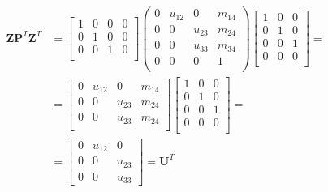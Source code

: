 \documentclass[\main/main.tex]{subfiles}
\begin{document}
\begin{equation}
\begin{split}
    \mathbf{Z} \mathbf{P}^T \mathbf{Z}^T &=
    \begin{bmatrix}
   1 & 0 & 0 & 0\\
    0 & 1 & 0 & 0\\
     0 & 0 & 1 & 0\\
    \end{bmatrix}
    \begin{pmatrix}
    0 &  u_{12} & 0 & m_{14}\\
    0 & 0 & u_{23} & m_{24}\\
    0 & 0 & u_{33} & m_{34}\\
    0 & 0 & 0 &1\\
    \end{pmatrix}
    \begin{bmatrix}
    1 & 0 & 0\\
    0 & 1& 0\\
    0 & 0 & 1\\
    0 & 0 & 0\\
    \end{bmatrix}
    = \\
    &= \begin{bmatrix}
    0 & u_{12} & 0 & m_{14}\\
    0 & 0 & u_{23} & m_{24}\\
    0 & 0 & u_{23} & m_{24}\\
    \end{bmatrix}
    \begin{bmatrix}
    1 & 0 & 0\\
    0 & 1& 0\\
    0 & 0 & 1\\
    0 & 0 & 0\\
    \end{bmatrix} = \\
    &= 
    \begin{bmatrix}
    0 & u_{12} & 0\\
    0 & 0 & u_{23}\\
    0 & 0 & u_{33}
    \end{bmatrix} =
    \mathbf{U}^T
    \end{split}
\end{equation}
\end{document}
